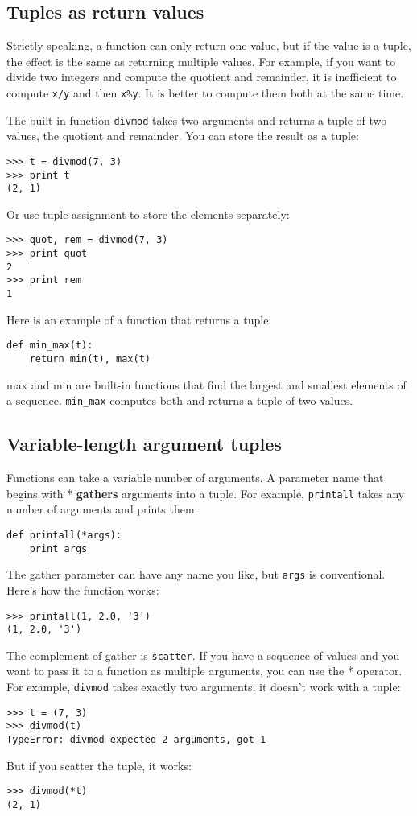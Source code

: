 \documentclass{article}
\begin{document}
\subsection{Tuples as return values}
Strictly speaking, a function can only return one value, but if the
value is a tuple, the effect is the same as returning multiple values.
For example, if you want to divide two integers and compute the
quotient and remainder, it is inefficient to compute \verb|x/y|
and then \verb|x%y|.
It is better to compute them both at the same time.

The built-in function \verb|divmod| takes two arguments and returns a tuple
of two values, the quotient and remainder. You can store the result as
a tuple:
\begin{verbatim}
>>> t = divmod(7, 3)
>>> print t
(2, 1)
\end{verbatim}
Or use tuple assignment to store the elements separately:
\begin{verbatim}
>>> quot, rem = divmod(7, 3)
>>> print quot
2
>>> print rem
1
\end{verbatim}
Here is an example of a function that returns a tuple:
\begin{verbatim}
def min_max(t):
    return min(t), max(t)
\end{verbatim}
    max and min are built-in functions that find the largest and
    smallest elements of a sequence.
    \verb|min_max| computes both and returns
    a tuple of two values.

\subsection{Variable-length argument tuples}
Functions can take a variable number of arguments. A parameter name
that begins with * \textbf{gathers} arguments into a tuple. For example,
\verb|printall| takes any number of arguments and prints them:
\begin{verbatim}
def printall(*args):
    print args
\end{verbatim}
The gather parameter can have any name you like, but \verb|args| is
conventional. Here’s how the function works:
\begin{verbatim}
>>> printall(1, 2.0, '3')
(1, 2.0, '3')
\end{verbatim}
The complement of gather is \verb|scatter|. If you have a sequence of
values and you want to pass it to a function as multiple
arguments, you can use the * operator. For example,
\verb|divmod| takes
exactly two arguments; it doesn’t work with a tuple:
\begin{verbatim}
>>> t = (7, 3)
>>> divmod(t)
TypeError: divmod expected 2 arguments, got 1
\end{verbatim}
But if you scatter the tuple, it works:
\begin{verbatim}
>>> divmod(*t)
(2, 1)
\end{verbatim}
\end{document}
